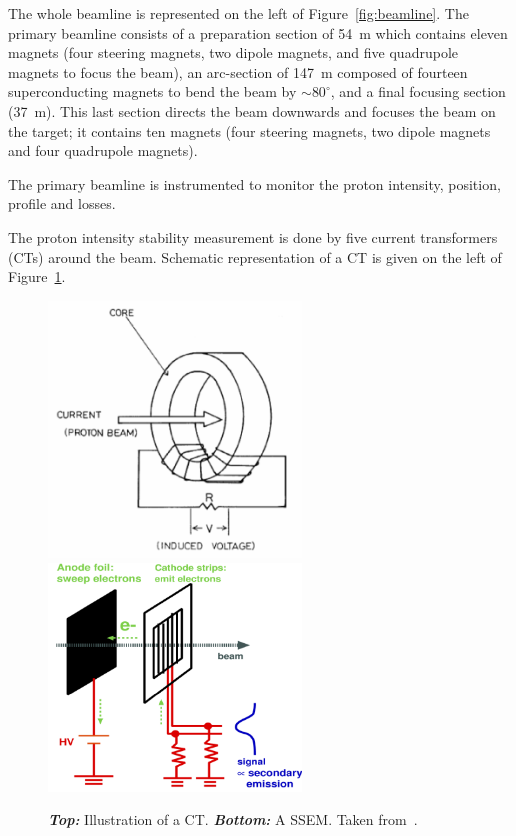 The whole beamline is represented on the left of
Figure~\ref{fig:beamline}. The primary beamline consists of a
preparation section of 54~m which contains eleven magnets (four
steering magnets, two dipole magnets, and five quadrupole magnets to
focus the beam), an arc-section of 147~m composed of fourteen
superconducting magnets to bend the beam by $\sim 80^{\circ}$, and a
final focusing section (37~m). This last section directs the beam
downwards and focuses the beam on the target; it contains ten magnets
(four steering magnets, two dipole magnets and four quadrupole
magnets).

The primary beamline is instrumented to monitor the proton intensity,
position, profile and losses.

The proton intensity stability measurement is done by five current
transformers (\Glspl{CT}) around the beam. Schematic representation of
a \Gls{CT} is given on the left of Figure~\ref{fig:ssem}.

\begin{figure}[ht]
  \center
  \includegraphics[width=0.6\textwidth]{images/t2k/ct.png} \\
  \includegraphics[width=0.6\textwidth]{images/t2k/ssem.png}
  \caption[Illustration of a CT and a SSEM]{\textbf{\textit{Top:}}
    Illustration of a \Gls{CT}. \textbf{\textit{Bottom:}} A
    \Gls{SSEM}. Taken from~\cite{Hartz}.}
  \label{fig:ssem}
\end{figure}

